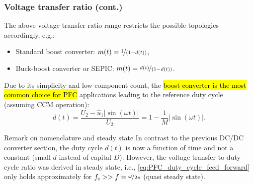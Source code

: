 \begin{frame}
    \frametitle{Voltage transfer ratio (cont.)} 
    The above voltage transfer ratio range restricts the possible topologies accordingly, e.g.:
    \begin{itemize}
        \item Standard boost converter: $m(t)=\nicefrac{1}{(1-d(t))}$,
        \item Buck-boost converter or SEPIC: $m(t)=\nicefrac{d(t)}{(1-d(t))}$.
    \end{itemize}
    Due to its simplicity and low component count, the \hl{boost converter is the most common choice for PFC} applications leading to the reference duty cycle (assuming CCM operation):
    \begin{equation}
        d(t) = \frac{U_2-\hat{u}_1|\sin(\omega t)|}{U_2} = 1 - \frac{1}{M}|\sin(\omega t)|.
        \label{eq:PFC_duty_cycle_feed_forward}
    \end{equation} 
    \begin{varblock}{Remark on nomenclature and steady state}
        In contrast to the previous DC/DC converter section, the duty cycle $d(t)$ is now a function of time and not a constant (small $d$ instead of capital $D$). However, the voltage transfer to duty cycle ratio was derived in steady state, i.e., \eqref{eq:PFC_duty_cycle_feed_forward} only holds approximately for $f_\mathrm{s}>> f=\nicefrac{\omega}{2\pi}$ (quasi steady state). 
    \end{varblock}
\end{frame}

